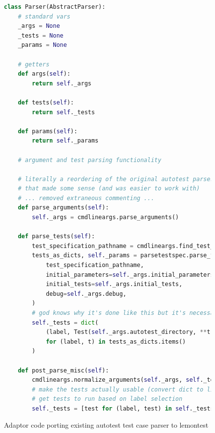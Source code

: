 \documentclass[hidelinks]{report}
\begin{document}
\begin{figure}[h]
	\centering
	\begin{lstlisting}[language=python, breaklines=true, linewidth=\linewidth, tabsize=4]
class Parser(AbstractParser):
    # standard vars
    _args = None
    _tests = None
    _params = None

    # getters
    def args(self):
        return self._args
    
    def tests(self):
        return self._tests
    
    def params(self):
        return self._params

    # argument and test parsing functionality

    # literally a reordering of the original autotest parser but done in a way
    # that made some sense (and was easier to work with)
    # ... removed extraneous commenting ...
    def parse_arguments(self):
        self._args = cmdlineargs.parse_arguments()

    def parse_tests(self):
        test_specification_pathname = cmdlineargs.find_test_specification(self._args)
        tests_as_dicts, self._params = parsetestspec.parse_file(
            test_specification_pathname,
            initial_parameters=self._args.initial_parameters,
            initial_tests=self._args.initial_tests,
            debug=self._args.debug,
        )
        # god knows why it's done like this but it's necessary for normalisation
        self._tests = dict(
            (label, Test(self._args.autotest_directory, **t))
            for (label, t) in tests_as_dicts.items()
        )

    def post_parse_misc(self):
        cmdlineargs.normalize_arguments(self._args, self._tests)
        # make the tests actually usable (convert dict to list)
        # get tests to run based on label selection
        self._tests = [test for (label, test) in self._tests.items() if label in self._args.labels]
	\end{lstlisting}
	\caption{Adaptor code porting existing autotest test case parser to lemontest}
	\label{fig:parserAdaptor}
\end{figure}
\end{document}
